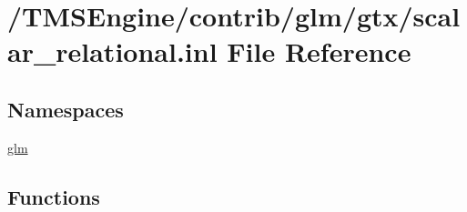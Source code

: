 \hypertarget{scalar__relational_8inl}{}\section{/\+T\+M\+S\+Engine/contrib/glm/gtx/scalar\+\_\+relational.inl File Reference}
\label{scalar__relational_8inl}
\subsection*{Namespaces}
\begin{DoxyCompactItemize}
\item 
 \hyperlink{namespaceglm}{glm}
\end{DoxyCompactItemize}
\subsection*{Functions}
